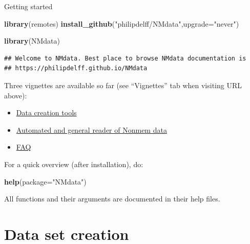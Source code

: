 \documentclass[
  8pt,
  ignorenonframetext,
  aspectratio=169]{beamer}
\newenvironment{Shaded}{\begin{snugshade}}{\end{snugshade}}
\newcommand{\DataTypeTok}[1]{\textcolor[rgb]{0.13,0.29,0.53}{#1}}
\newcommand{\KeywordTok}[1]{\textcolor[rgb]{0.13,0.29,0.53}{\textbf{#1}}}
\newcommand{\NormalTok}[1]{#1}
\newcommand{\StringTok}[1]{\textcolor[rgb]{0.31,0.60,0.02}{#1}}
\providecommand{\tightlist}{%
  \setlength{\itemsep}{0pt}\setlength{\parskip}{0pt}}
\begin{document}
\begin{frame}[fragile]{Getting started}
\protect\hypertarget{getting-started}{}
\begin{Shaded}
\begin{Highlighting}[]
\KeywordTok{library}\NormalTok{(remotes)}
\KeywordTok{install\_github}\NormalTok{(}\StringTok{"philipdelff/NMdata"}\NormalTok{,}\DataTypeTok{upgrade=}\StringTok{"never"}\NormalTok{)}
\end{Highlighting}
\end{Shaded}

\begin{Shaded}
\begin{Highlighting}[]
\KeywordTok{library}\NormalTok{(NMdata)}
\end{Highlighting}
\end{Shaded}

\begin{verbatim}
## Welcome to NMdata. Best place to browse NMdata documentation is
## https://philipdelff.github.io/NMdata
\end{verbatim}

Three vignettes are available so far (see ``Vignettes'' tab when
visiting URL above):

\begin{itemize}
\tightlist
\item
  \href{https://philipdelff.github.io/NMdata/articles/DataCreate.html}{Data
  creation tools}
\item
  \href{https://philipdelff.github.io/NMdata/articles/NMscanData.html}{Automated
  and general reader of Nonmem data}
\item
  \href{https://philipdelff.github.io/NMdata/articles/NMdata-FAQ.html}{FAQ}
\end{itemize}

For a quick overview (after installation), do:

\begin{Shaded}
\begin{Highlighting}[]
\KeywordTok{help}\NormalTok{(}\DataTypeTok{package=}\StringTok{"NMdata"}\NormalTok{)}
\end{Highlighting}
\end{Shaded}

All functions and their arguments are documented in their help files.
\end{frame}

\hypertarget{data-set-creation}{%
\section{Data set creation}\label{data-set-creation}}
\end{document}
